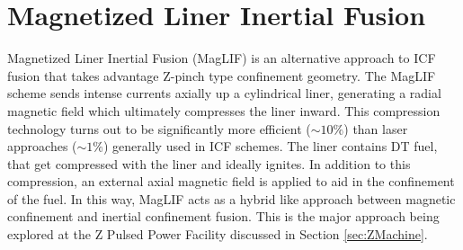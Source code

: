 \section{Magnetized Liner Inertial Fusion}

	Magnetized Liner Inertial Fusion (MagLIF) is an alternative approach to ICF fusion that takes advantage Z-pinch type confinement geometry. The MagLIF scheme sends intense currents axially up a cylindrical liner, generating a radial magnetic field which ultimately compresses the liner inward. This compression technology turns out to be significantly more efficient ($\sim10\%$) than laser approaches ($\sim1\%$) generally used in ICF schemes. The liner contains DT fuel, that get compressed with the liner and ideally ignites. In addition to this compression, an external axial magnetic field is applied to aid in the confinement of the fuel. In this way, MagLIF acts as a hybrid like approach between magnetic confinement and inertial confinement fusion. This is the major approach being explored at the Z Pulsed Power Facility discussed in Section \ref{sec:ZMachine}.
	
	\begin{figure}[h!]
		\centering
		\caption{}
		\label{fig:MagLIF}
	\end{figure}

